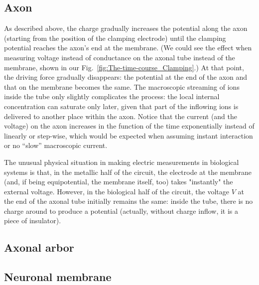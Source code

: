 \subsection{Axon\label{sec:Single-AxonalChargeDelivery}}


As described above, the charge gradually increases the potential along
the axon (starting from the position of the clamping electrode) until
the clamping potential reaches the axon's end at the membrane. (We
could see the effect when measuring voltage instead of conductance
on the axonal tube instead of the membrane, shown in our Fig.~\ref{fig:The-time-course_Clamping}.)
At that point, the driving force gradually disappears: the potential
at the end of the axon and that on the membrane becomes the same.
The macroscopic streaming of ions inside the tube only slightly complicates
the process: the local internal concentration can saturate only later,
given that part of the inflowing ions is delivered to another place
within the axon. Notice that the current (and the voltage) on the
axon increases in the function of the time exponentially instead of
linearly or step-wise, which would be expected when assuming instant
interaction or no ``slow'' macroscopic current.

The unusual physical situation in making electric measurements in biological systems is that, in the metallic half
of the circuit, the electrode at the membrane (and, if being equipotential,
the membrane itself, too) takes "instantly" the external voltage.
However, in the biological half of the circuit, the voltage $V$ at
the end of the axonal tube initially remains the same: inside the
tube, there is no charge around to produce a potential (actually,
without charge inflow, it is a piece of insulator). 



\subsection{Axonal arbor\label{sub:Single-Axonal-arbor}}

\subsection{Neuronal membrane\label{sec:Single-NeuronalMembrane}}

